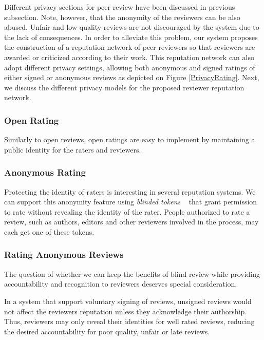 
Different privacy sections for peer review have been discussed in previous
subsection. Note, however, that the anonymity of the reviewers can be also
abused. Unfair and low quality reviews are not discouraged by the system due to
the lack of consequences. In order to alleviate this problem, our system
proposes the construction of a reputation network of peer reviewers so that
reviewers are awarded or criticized according to their work. This reputation
network can also adopt different privacy settings, allowing both anonymous and
signed ratings of either signed or anonymous reviews as depicted on Figure
\ref{PrivacyRating}. Next, we discuss the different privacy models for the
proposed reviewer reputation network.


\subsubsection*{Open Rating}
Similarly to open reviews, open ratings are easy to implement by maintaining a
public identity for the raters and reviewers.

\subsubsection*{Anonymous Rating}

Protecting the identity of raters is interesting in several reputation systems.
We can support this anonymity feature using \emph{blinded tokens}
~\cite{schaub2016trustless} that grant permission to rate without revealing the
identity of the rater. People authorized to rate a review, such as authors,
editors and other reviewers involved in the process, may each get one of these
tokens.

\subsubsection*{Rating Anonymous Reviews}

The question of whether we can keep the benefits of blind review while providing
accountability and recognition to reviewers deserves special consideration.

In a system that support voluntary signing of reviews, unsigned reviews would
not affect the reviewers reputation unless they acknowledge their authorship.
Thus, reviewers may only reveal their identities for well rated reviews,
reducing the desired accountability for poor quality, unfair or late reviews.

